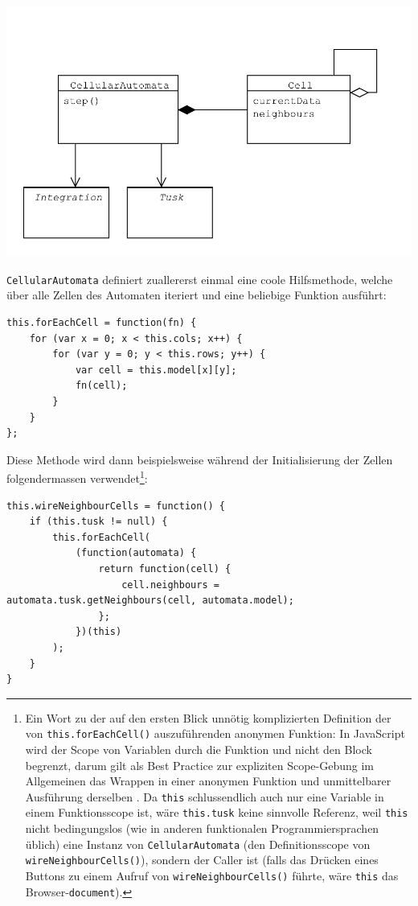 \documentclass[11pt]{report} %
\theoremstyle{definition}
\begin{document}
\includegraphics[scale=0.7]{uml/Automata.pdf}

{\tt CellularAutomata} definiert zuallererst einmal eine coole Hilfsmethode, welche über alle Zellen des Automaten iteriert und eine beliebige Funktion ausführt:

\begin{lstlisting}
this.forEachCell = function(fn) {
	for (var x = 0; x < this.cols; x++) {
		for (var y = 0; y < this.rows; y++) {
			var cell = this.model[x][y];
			fn(cell);
		}
	}
};
\end{lstlisting}

Diese Methode wird dann beispielsweise während der Initialisierung der Zellen folgendermassen verwendet\footnote{Ein Wort zu der auf den ersten Blick unnötig komplizierten Definition der von {\tt this.forEachCell()} auszuführenden anonymen Funktion: In JavaScript wird der Scope von Variablen durch die Funktion und nicht den Block begrenzt, darum gilt als Best Practice zur expliziten Scope-Gebung im Allgemeinen das Wrappen in einer anonymen Funktion und unmittelbarer Ausführung derselben \cite{UnderstandingClosures}. Da {\tt this} schlussendlich auch nur eine Variable in einem Funktionsscope ist, wäre {\tt this.tusk} keine sinnvolle Referenz, weil {\tt this} nicht bedingungslos (wie in anderen funktionalen Programmiersprachen üblich) eine Instanz von {\tt CellularAutomata} (den Definitionsscope von {\tt wireNeighbourCells()}), sondern der Caller ist (falls das Drücken eines Buttons zu einem Aufruf von {\tt wireNeighbourCells()} führte, wäre {\tt this} das Browser-{\tt document}).}:
\begin{lstlisting}
this.wireNeighbourCells = function() {
	if (this.tusk != null) {
		this.forEachCell(
			(function(automata) {
				return function(cell) {
					cell.neighbours = automata.tusk.getNeighbours(cell, automata.model);
				};
			})(this)
		);
	}
}
\end{lstlisting}
\end{document}
